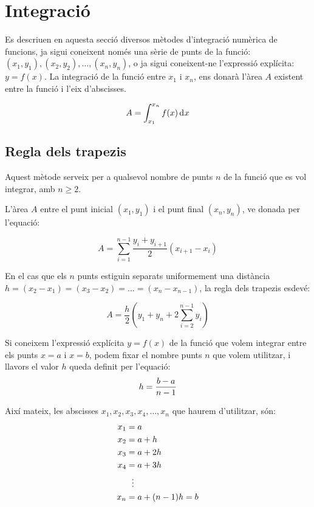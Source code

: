 \section{Integració}

Es descriuen en aquesta secció diversos mètodes d'integració numèrica de funcions, ja sigui coneixent només una sèrie de punts de la funció: $(x_1, y_1), (x_2, y_2), \dots ,(x_n, y_n)$, o ja sigui coneixent-ne l'expressió explícita: $y=f(x)$. La integració de la funció entre $x_1$ i $x_n$, ens donarà l'àrea $A$ existent entre la funció i l'eix d'abscisses.

 \begin{equation}
    A = \int_{x_1}^{x_n} f(x) \diff x
 \end{equation}

\subsection{Regla dels trapezis}

Aquest mètode serveix per a qualsevol nombre de punts $n$ de la funció que es vol integrar, amb $n \geq 2$.

L'àrea $A$ entre el punt inicial $(x_1, y_1)$ i el punt final $(x_n, y_n)$, ve donada per l'equació:

 \begin{equation}
    A = \sum_{i=1}^{n-1} \frac{y_i + y_{i+1}}{2} (x_{i+1}-x_i)
 \end{equation}

En el cas que els $n$ punts estiguin separats uniformement una distància $h = (x_2-x_1) = (x_3-x_2) = \dots = (x_n-x_{n-1})$, la regla dels trapezis esdevé:

 \begin{equation}\label{eq:trap}
    A = \frac{h}{2} \left( y_1 + y_n + 2 \sum_{i=2}^{n-1} y_i \right)
 \end{equation}

Si coneixem l'expressió explícita $y=f(x)$ de la funció que volem integrar entre els punts $x=a$ i $x=b$, podem fixar el nombre punts $n$ que volem utilitzar, i llavors el valor $h$ queda definit per l'equació:
\begin{equation}\label{eq:trap_1}
    h = \frac{b-a}{n-1}\\
\end{equation}

Així mateix, les abscisses $x_1, x_2, x_3,x_4, \dotsc , x_n$ que haurem d'utilitzar, són:
\begin{align}\label{eq:trap_2}
    x_1 &= a \notag\\
    x_2 &= a + h \notag\\
    x_3 &= a + 2 h \notag\\
    x_4 &= a + 3 h\\
    {} &\hspace{1.5ex}\vdots {} \notag\\
    x_n &= a + (n-1)h =b \notag
\end{align}

